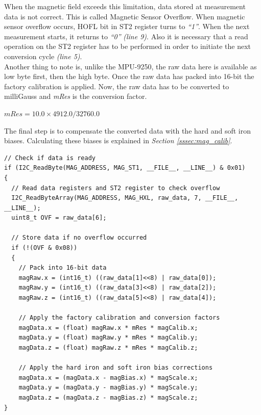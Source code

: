 \documentclass[a4paper,12pt,oneside]{book}
\begin{document}
When the magnetic field exceeds this limitation, data stored at measurement data is not correct. This is called Magnetic Sensor Overflow. When magnetic sensor overflow occurs, HOFL bit in ST2 register turns to \textit{“1”}. When the next measurement starts, it returns to \textit{“0”} \textit{(line 9)}. Also it is necessary that a read operation on the ST2 register has to be performed in order to initiate the next conversion cycle \textit{(line 5)}.\\ 

Another thing to note is, unlike the MPU-9250, the raw data here is available as low byte first, then the high byte. Once the raw data has packed into 16-bit the factory calibration is applied. Now, the raw data has to be converted to milliGauss and \textit{mRes} is the conversion factor.

\begin{center}
$ mRes = 10.0 \times 4912.0/32760.0$
\end{center}

\bigskip

The final step is to compensate the converted data with the hard and soft iron biases. Calculating these biases is explained in \textit{Section \ref{sssec:mag_calib}}.\\ 

\begin{verbatim}
// Check if data is ready
if (I2C_ReadByte(MAG_ADDRESS, MAG_ST1, __FILE__, __LINE__) & 0x01)
{
  // Read data registers and ST2 register to check overflow
  I2C_ReadByteArray(MAG_ADDRESS, MAG_HXL, raw_data, 7, __FILE__, __LINE__);
  uint8_t OVF = raw_data[6];

  // Store data if no overflow occurred
  if (!(OVF & 0x08))
  {
    // Pack into 16-bit data
    magRaw.x = (int16_t) ((raw_data[1]<<8) | raw_data[0]);
    magRaw.y = (int16_t) ((raw_data[3]<<8) | raw_data[2]);
    magRaw.z = (int16_t) ((raw_data[5]<<8) | raw_data[4]);

    // Apply the factory calibration and conversion factors
    magData.x = (float) magRaw.x * mRes * magCalib.x; 
    magData.y = (float) magRaw.y * mRes * magCalib.y; 
    magData.z = (float) magRaw.z * mRes * magCalib.z; 
    
    // Apply the hard iron and soft iron bias corrections
    magData.x = (magData.x - magBias.x) * magScale.x;
    magData.y = (magData.y - magBias.y) * magScale.y;
    magData.z = (magData.z - magBias.z) * magScale.z;
}
\end{verbatim}
\end{document}

